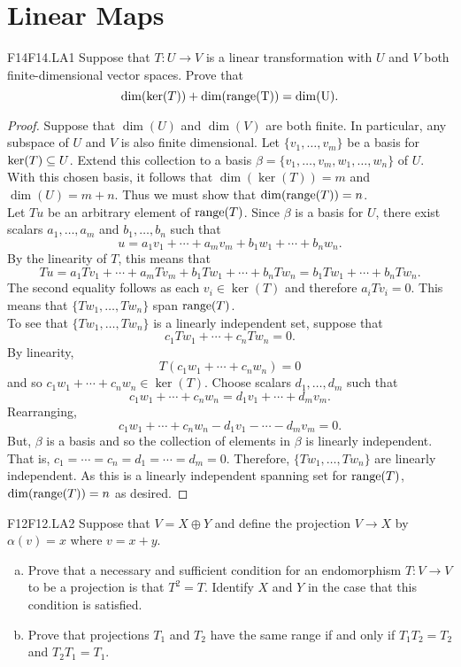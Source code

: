 \documentclass[../AlgebraQualSolutions.tex]{subfiles}
\begin{document}
\section{Linear Maps}

	\begin{prob}{F14}{F14.LA1}
		Suppose that $T: U \to V$ is a linear transformation with $U$ and $V$ both finite-dimensional vector spaces. Prove that
			\[\dim(\ker(T)) + \dim(\rm{range}(T)) = \dim(U).\]
	\end{prob}

	\begin{proof}
		Suppose that $\dim(U)$ and $\dim(V)$ are both finite. In particular, any subspace of $U$ and $V$ is also finite dimensional. Let $\{v_1,\ldots, v_m\}$ be a basis for $\ker(T) \subseteq U$. Extend this collection to a basis $\beta = \{v_1,\ldots, v_m, w_1,\ldots, w_n\}$ of $U$. With this chosen basis, it follows that $\dim(\ker(T)) = m$ and $\dim(U) = m + n$. Thus we must show that $\dim(\mathrm{range}(T)) = n$.\\

		Let $Tu$ be an arbitrary element of $\mathrm{range}(T)$. Since $\beta$ is a basis for $U$, there exist scalars $a_1,\ldots, a_m$ and $b_1,\ldots,b_n$ such that
			\[u = a_1v_1 + \cdots + a_mv_m + b_1w_1 + \cdots + b_nw_n. \]
		By the linearity of $T$, this means that
			\[Tu = a_1Tv_1 + \cdots + a_mTv_m + b_1Tw_1 + \cdots + b_nTw_n = b_1Tw_1 + \cdots + b_nTw_n.\]
		The second equality follows as each $v_i \in \ker(T)$ and therefore $a_iTv_i = 0$. This means that $\{Tw_1,\ldots,Tw_n\}$ span $\mathrm{range}(T)$.\\

		To see that $\{Tw_1,\ldots,Tw_n\}$ is a linearly independent set, suppose that
			\[c_1Tw_1 + \cdots + c_nTw_n = 0.\]
		By linearity,
			\[T(c_1w_1 + \cdots + c_nw_n) = 0\]
		and so $c_1w_1 + \cdots + c_nw_n \in \ker(T)$. Choose scalars $d_1,\ldots, d_m$ such that
			\[c_1w_1 + \cdots + c_nw_n = d_1v_1 + \cdots + d_mv_m.\]
		Rearranging,
			\[c_1w_1 + \cdots + c_nw_n - d_1v_1 - \cdots - d_mv_m = 0.\]
		But, $\beta$ is a basis and so the collection of elements in $\beta$ is linearly independent. That is, $c_1 = \cdots = c_n = d_1 = \cdots = d_m = 0$. Therefore, $\{Tw_1,\ldots,Tw_n\}$ are linearly independent. As this is a linearly independent spanning set for $\mathrm{range}(T)$, $\dim(\mathrm{range}(T)) = n$ as desired.
	\end{proof}

	\begin{prob}{F12}{F12.LA2}
	Suppose that $V = X \oplus Y$ and define the projection $V \to X$ by $\alpha(v) = x$ where $v = x+y$.
	\begin{enumerate}[(a)]
	\item Prove that a necessary and sufficient condition for an endomorphism $T: V \to V$ to be a projection is that $T^2 = T$. Identify $X$ and $Y$ in the case that this condition is satisfied.
	\item Prove that projections $T_1$ and $T_2$ have the same range if and only if $T_1T_2 = T_2$ and $T_2T_1 = T_1$.
	\end{enumerate}
	\end{prob}
\end{document}
